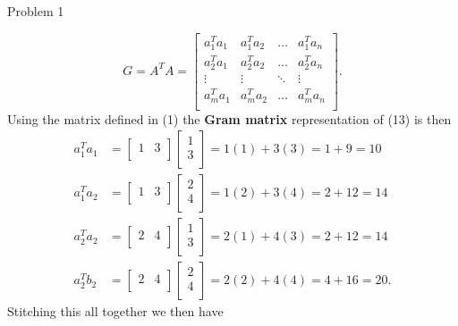 \begin{problem}{Problem 1}
\begin{highlight}[Solution]
        \begin{equation}
            G = A^{T}A = 
            \begin{bmatrix}
                a_{1}^{T}a_{1} & a_{1}^{T}a_{2} & \dots & a_{1}^{T}a_{n} \\
                a_{2}^{T}a_{1} & a_{2}^{T}a_{2} & \dots & a_{2}^{T}a_{n} \\
                \vdots & \vdots & \ddots & \vdots \\
                a_{m}^{T}a_{1} & a_{m}^{T}a_{2} & \dots & a_{m}^{T}a_{n} \\
            \end{bmatrix}.
        \end{equation}
        Using the matrix defined in (1) the \textbf{Gram matrix} representation of (13) is then 
        \begin{align*}
            a_{1}^{T}a_{1} & = 
            \begin{bmatrix}
                1 & 3 \\
            \end{bmatrix}
            \begin{bmatrix}
                1 \\
                3 \\
            \end{bmatrix}
            = 1(1) + 3(3) = 1 + 9 = 10 \\
            a_{1}^{T}a_{2} & = 
            \begin{bmatrix}
                1 & 3 \\
            \end{bmatrix}
            \begin{bmatrix}
                2 \\
                4 \\
            \end{bmatrix}
            = 1(2) + 3(4) = 2 + 12 = 14 \\
            a_{2}^{T}a_{2} & = 
            \begin{bmatrix}
                2 & 4 \\
            \end{bmatrix}
            \begin{bmatrix}
                1 \\
                3 \\
            \end{bmatrix}
            = 2(1) + 4(3) = 2 + 12 = 14 \\
            a_{2}^{T}b_{2} & = 
            \begin{bmatrix}
                2 & 4 \\
            \end{bmatrix}
            \begin{bmatrix}
                2 \\
                4 \\
            \end{bmatrix}
            = 2(2) + 4(4) = 4 + 16 = 20.
        \end{align*}
        Stitching this all together we then have 


\end{highlight}
\end{problem}
